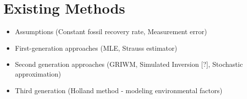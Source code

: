 
\chapter{Existing Methods}\label{background}


\begin{itemize}
    \item Assumptions (Constant fossil recovery rate, Measurement error)
    \item First-generation approaches (MLE, Strauss estimator)
    \item Second generation approaches (GRIWM, Simulated Inversion [?], Stochastic approximation)
    \item Third generation (Holland method - modeling environmental factors)
\end{itemize}